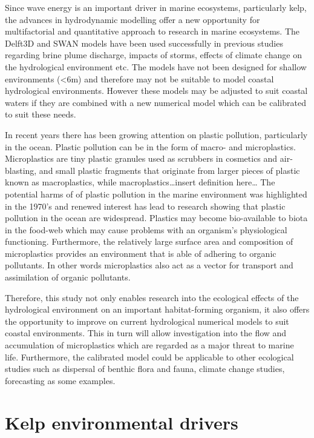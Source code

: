 \documentclass[]{article}
\begin{document}
Since wave energy is an important driver in marine ecosystems,
particularly kelp, the advances in hydrodynamic modelling offer a new
opportunity for multifactorial and quantitative approach to research in
marine ecosystems. The Delft3D and SWAN models have been used
successfully in previous studies regarding brine plume discharge,
impacts of storms, effects of climate change on the hydrological
environment etc. The models have not been designed for shallow
environments (\textless{}6m) and therefore may not be suitable to model
coastal hydrological environments. However these models may be adjusted
to suit coastal waters if they are combined with a new numerical model
which can be calibrated to suit these needs.

In recent years there has been growing attention on plastic pollution,
particularly in the ocean. Plastic pollution can be in the form of
macro- and microplastics. Microplastics are tiny plastic granules used
as scrubbers in cosmetics and air-blasting, and small plastic fragments
that originate from larger pieces of plastic known as macroplastics,
while macroplastics\ldots{}insert definition here\ldots{} The potential
harms of of plastic pollution in the marine environment was highlighted
in the 1970's and renewed interest has lead to research showing that
plastic pollution in the ocean are widespread. Plastics may become
bio-available to biota in the food-web which may cause problems with an
organism's physiological functioning. Furthermore, the relatively large
surface area and composition of microplastics provides an environment
that is able of adhering to organic pollutants. In other words
microplastics also act as a vector for transport and assimilation of
organic pollutants.

Therefore, this study not only enables research into the ecological
effects of the hydrological environment on an important habitat-forming
organism, it also offers the opportunity to improve on current
hydrological numerical models to suit coastal environments. This in turn
will allow investigation into the flow and accumulation of microplastics
which are regarded as a major threat to marine life. Furthermore, the
calibrated model could be applicable to other ecological studies such as
dispersal of benthic flora and fauna, climate change studies,
forecasting as some examples.

\hypertarget{kelp-environmental-drivers}{%
\section{Kelp environmental drivers}\label{kelp-environmental-drivers}}
\end{document}
